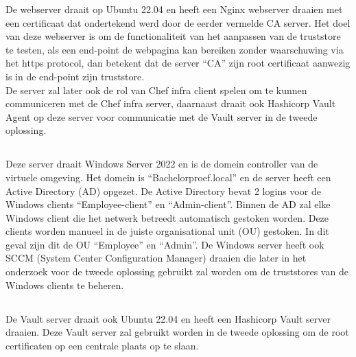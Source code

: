 De webserver draait op Ubuntu 22.04 en heeft een Nginx webserver draaien met een certificaat dat ondertekend werd door de eerder vermelde CA server.
Het doel van deze webserver is om de functionaliteit van het aanpassen van de truststore te testen, als een end-point de webpagina kan bereiken zonder waarschuwing via het https protocol, dan betekent dat de server ``CA'' zijn root certificaat aanwezig is in de end-point zijn truststore. \\
De server zal later ook de rol van Chef infra client spelen om te kunnen communiceren met de Chef infra server, daarnaast draait ook Hashicorp Vault Agent op deze server voor communicatie met de Vault server in de tweede oplossing.

\subsection{}
\label{subsec:Windows_server}

Deze server draait Windows Server 2022 en is de domein controller van de virtuele omgeving. Het domein is ``Bachelorproef.local'' en de server heeft een Active Directory (AD) opgezet. De Active Directory bevat 2 logins voor de Windows clients ``Employee-client'' en ``Admin-client''. Binnen de AD zal elke Windows client die het netwerk betreedt automatisch gestoken worden. 
Deze clients worden manueel in de juiste organisational unit (OU) gestoken. In dit geval zijn dit de OU ``Employee'' en ``Admin''.
De Windows server heeft ook SCCM (System Center Configuration Manager) draaien die later in het onderzoek voor de tweede oplossing gebruikt zal worden om de truststores van de Windows clients te beheren.

\subsection{}
\label{subsec:Vault}

De Vault server draait ook Ubuntu 22.04 en heeft een Hashicorp Vault server draaien. Deze Vault server zal gebruikt worden in de tweede oplossing om de root certificaten op een centrale plaats op te slaan.

\subsection{}
\label{subsec:Employee-client}

